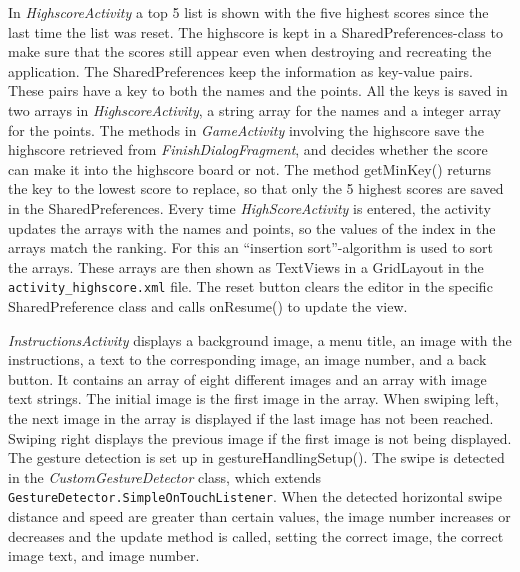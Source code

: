 In \emph{HighscoreActivity} a top 5 list is shown with the five highest scores since the last time the list was reset. The highscore is kept in a SharedPreferences-class to make sure that the scores still appear even when destroying and recreating the application. The SharedPreferences keep the information as key-value pairs. These pairs have a key to both the names and the points. All the keys is saved in two arrays in \emph{HighscoreActivity}, a string array for the names and a integer array for the points.
The methods in \emph{GameActivity} involving the highscore save the highscore retrieved from \emph{FinishDialogFragment}, and decides whether the score can make it into the highscore board or not. The method getMinKey() returns the key to the lowest score to replace, so that only the 5 highest scores are saved in the SharedPreferences.
Every time \emph{HighScoreActivity} is entered, the activity updates the arrays with the names and points, so the values of the index in the arrays match the ranking. For this an “insertion sort”-algorithm is used to sort the arrays. These arrays are then shown as TextViews in a GridLayout in the \verb|activity_highscore.xml| file.
The reset button clears the editor in the specific SharedPreference class and calls onResume() to update the view.  \newline

\emph{InstructionsActivity} displays a background image, a menu title, an image with the instructions, a text to the corresponding image, an image number, and a back button. It contains an array of eight different images and an array with image text strings. The initial image is the first image in the array. When swiping left, the next image in the array is displayed if the last image has not been reached. Swiping right displays the previous image if the first image is not being displayed. The gesture detection is set up in gestureHandlingSetup(). The swipe is detected in the \emph{CustomGestureDetector} class, which extends \verb|GestureDetector.SimpleOnTouchListener|. When the detected horizontal swipe distance and speed are greater than certain values, the image number increases or decreases and the update method is called, setting the correct image, the correct image text, and image number. \newline

